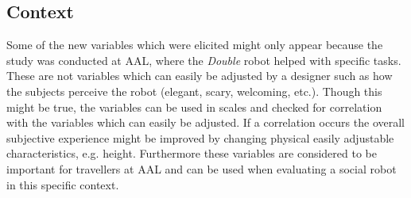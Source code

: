 \subsection{Context}
 Some of the new variables which were elicited might only appear because the study was conducted at AAL, where the \textit{Double} robot helped with specific tasks. These are not variables which can easily be adjusted by a designer such as how the subjects perceive the robot (elegant, scary, welcoming, etc.). Though this might be true, the variables can be used in scales and checked for correlation with the variables which can easily be adjusted. If a correlation occurs the overall subjective experience might be improved by changing physical easily adjustable characteristics, e.g. height. Furthermore these variables are considered to be important for travellers at AAL and can be used when evaluating a social robot in this specific context. 
